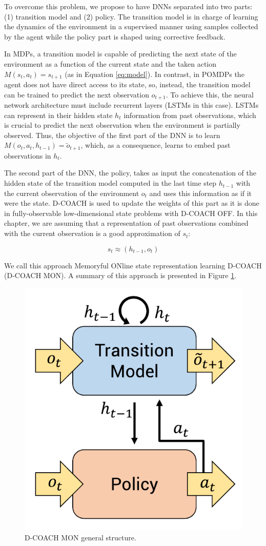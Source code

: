 To overcome this problem, we propose to have DNNs separated into two parts: (1) transition model and (2) policy. The transition model is in charge of learning the dynamics of the environment in a supervised manner using samples collected by the agent while the policy part is shaped using corrective feedback. 

In MDPs, a transition model is capable of predicting the next state of the environment as a function of the current state and the taken action $M(s_{t},a_{t}) = s_{t+1}$ (as in Equation \ref{eq:model}). In contrast, in POMDPs the agent does not have direct access to its state, so, instead, the transition model can be trained to predict the next observation $o_{t+1}$. To achieve this, the neural network architecture must include recurrent layers (LSTMs in this case). LSTMs can represent in their hidden state $h_{t}$ information from past observations, which is crucial to predict the next observation when the environment is partially observed. Thus, the objective of the first part of the DNN is to learn $M(o_{t},a_{t}, h_{t-1}) = \widetilde o_{t+1}$, which, as a consequence, learns to embed past observations in $h_{t}$.

The second part of the DNN, the policy, takes as input the concatenation of the hidden state of the transition model computed in the last time step $h_{t-1}$ with the current observation of the environment $o_{t}$ and uses this information as if it were the state. D-COACH is used to update the weights of this part as it is done in fully-observable low-dimensional state problems with D-COACH OFF. In this chapter, we are assuming that a representation of past observations combined with the current observation is a good approximation of $s_{t}$:

\begin{equation}
s_{t}\approx (h_{t-1}, o_{t})    
\end{equation}

We call this approach Memoryful ONline state representation learning D-COACH (D-COACH MON). A summary of this approach is presented in Figure \ref{fig:mb_dcoach}.

\begin{figure}[h]
    \centering
    \includegraphics[width=0.4\linewidth]{imagenes/cap4/model_based_dcoach.pdf}
    \caption{D-COACH MON general structure.}
    \label{fig:mb_dcoach}
\end{figure}

